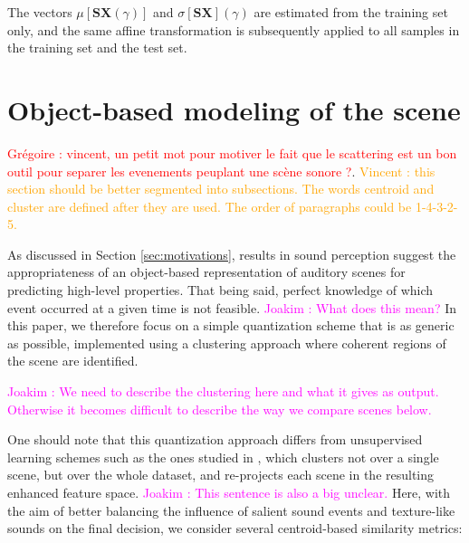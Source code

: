 \documentclass[journal]{IEEEtran}
\newcommand{\vl}[1]{\textcolor{orange}{Vincent : #1}}
\newcommand{\gl}[1]{\textcolor{red}{Gr\'egoire : #1}}
\newcommand{\ja}[1]{\textcolor{magenta}{Joakim : #1}}
\begin{document}
The vectors $\mu[\mathbf{S}\boldsymbol{X}(\gamma)]$ and $\sigma[\mathbf{S}\boldsymbol{X}](\gamma)$ are estimated from the training set only, and the same affine transformation is subsequently applied to all samples in the training set and the test set.

\section{Object-based modeling of the scene}
\label{sec:object}



\gl{vincent, un petit mot pour motiver le fait que le scattering est un bon outil pour separer les evenements peuplant une scène sonore ?}. 
\vl{this section should be better segmented into subsections. The words centroid and cluster are defined after they are used. The order of paragraphs could be 1-4-3-2-5.}

As discussed in Section \ref{sec:motivations}, results in sound perception suggest the appropriateness of an object-based representation of auditory scenes for predicting high-level properties. That being said, perfect knowledge of which event occurred at a given time is not feasible. \ja{What does this mean?} In this paper, we therefore focus on a simple quantization scheme that is as generic as possible, implemented using a clustering approach where coherent regions of the scene are identified.

\ja{We need to describe the clustering here and what it gives as output. Otherwise it becomes difficult to describe the way we compare scenes below.}

One should note that this quantization approach differs from unsupervised learning schemes such as the ones studied in \cite{bisot2016acoustic}, which clusters not over a single scene, but over the whole dataset, and re-projects each scene in the resulting enhanced feature space. \ja{This sentence is also a big unclear.}
Here, with the aim of better balancing the influence of salient sound events and texture-like sounds on the final decision, we consider several centroid-based similarity metrics:
\end{document}
